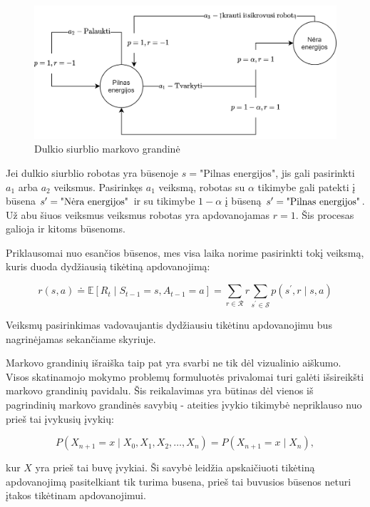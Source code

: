 \documentclass[a4paper, 12pt]{article}
\begin{document}
\begin{figure}[h]
\centering
\includegraphics[width=1\textwidth]{DulkiuSiurblys}
\caption{Dulkio siurblio markovo grandinė}
\label{DulkiuSiurblys}
\end{figure}

Jei dulkio siurblio robotas yra būsenoje $s = \text{"Pilnas energijos"}$, jis gali pasirinkti $a_1$ arba $a_2$ veiksmus. Pasirinkęs $a_1$ veiksmą, robotas su $\alpha$ tikimybe gali patekti į būsena $s\sp{\prime} = \text{"Nėra energijos"}$ ir su tikimybe $1-\alpha$ į būseną $s\sp{\prime} = \text{"Pilnas energijos"}$. Už abu šiuos veiksmus veiksmus robotas yra apdovanojamas $r=1$. Šis procesas galioja ir kitoms būsenoms. 

Priklausomai nuo esančios būsenos, mes visa laika norime pasirinkti tokį veiksmą, kuris duoda dydžiausią tikėtiną apdovanojimą:

\begin{equation}
r(s, a) \doteq \mathbb{E}\left[R_{t} \mid S_{t-1}=s, A_{t-1}=a\right]=\sum_{r \in \mathcal{R}} r \sum_{s^{\prime} \in \mathcal{S}} p\left(s^{\prime}, r \mid s, a\right)
\end{equation}

Veiksmų pasirinkimas vadovaujantis dydžiausiu tikėtinu apdovanojimu bus nagrinėjamas sekančiame skyriuje.

Markovo grandinių išraiška taip pat yra svarbi ne tik dėl vizualinio aiškumo. Visos skatinamojo mokymo problemų formuluotės privalomai turi galėti išsireikšti markovo grandinių pavidalu. Šis reikalavimas yra būtinas dėl vienos iš pagrindinių markovo grandinės savybių - ateities įvykio tikimybė nepriklauso nuo prieš tai įvykusių įvykių:

\begin{equation}
P\left(X_{n+1}=x \mid X_{0}, X_{1}, X_{2}, \ldots, X_{n}\right)=P\left(X_{n+1}=x \mid X_{n}\right),
\end{equation}

kur $X$ yra prieš tai buvę įvykiai. Ši savybė leidžia apskaičiuoti tikėtiną apdovanojimą pasitelkiant tik turima busena, prieš tai buvusios būsenos neturi įtakos tikėtinam apdovanojimui.
\end{document}
